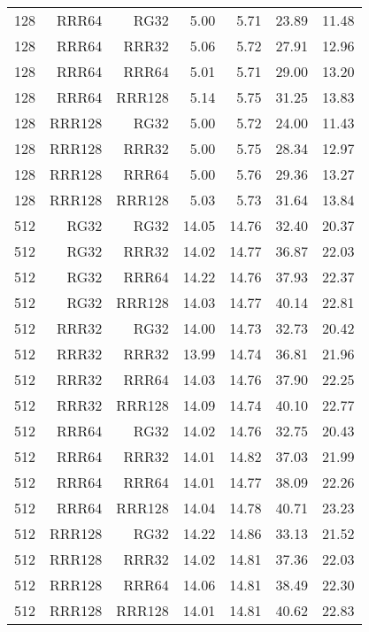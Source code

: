 \begin{table}
\begin{tabular}{|r|r|r|r|r|r|r|}
128 & RRR64 & RG32 & 5.00 & 5.71 & 23.89 & 11.48 \\
128 & RRR64 & RRR32 & 5.06 & 5.72 & 27.91 & 12.96 \\
128 & RRR64 & RRR64 & 5.01 & 5.71 & 29.00 & 13.20 \\
128 & RRR64 & RRR128 & 5.14 & 5.75 & 31.25 & 13.83 \\
128 & RRR128 & RG32 & 5.00 & 5.72 & 24.00 & 11.43 \\
128 & RRR128 & RRR32 & 5.00 & 5.75 & 28.34 & 12.97 \\
128 & RRR128 & RRR64 & 5.00 & 5.76 & 29.36 & 13.27 \\
128 & RRR128 & RRR128 & 5.03 & 5.73 & 31.64 & 13.84 \\
512 & RG32 & RG32 & 14.05 & 14.76 & 32.40 & 20.37 \\
512 & RG32 & RRR32 & 14.02 & 14.77 & 36.87 & 22.03 \\
512 & RG32 & RRR64 & 14.22 & 14.76 & 37.93 & 22.37 \\
512 & RG32 & RRR128 & 14.03 & 14.77 & 40.14 & 22.81 \\
512 & RRR32 & RG32 & 14.00 & 14.73 & 32.73 & 20.42 \\
512 & RRR32 & RRR32 & 13.99 & 14.74 & 36.81 & 21.96 \\
512 & RRR32 & RRR64 & 14.03 & 14.76 & 37.90 & 22.25 \\
512 & RRR32 & RRR128 & 14.09 & 14.74 & 40.10 & 22.77 \\
512 & RRR64 & RG32 & 14.02 & 14.76 & 32.75 & 20.43 \\
512 & RRR64 & RRR32 & 14.01 & 14.82 & 37.03 & 21.99 \\
512 & RRR64 & RRR64 & 14.01 & 14.77 & 38.09 & 22.26 \\
512 & RRR64 & RRR128 & 14.04 & 14.78 & 40.71 & 23.23 \\
512 & RRR128 & RG32 & 14.22 & 14.86 & 33.13 & 21.52 \\
512 & RRR128 & RRR32 & 14.02 & 14.81 & 37.36 & 22.03 \\
512 & RRR128 & RRR64 & 14.06 & 14.81 & 38.49 & 22.30 \\
512 & RRR128 & RRR128 & 14.01 & 14.81 & 40.62 & 22.83 \\
\hline
\end{tabular}
\end{table}

